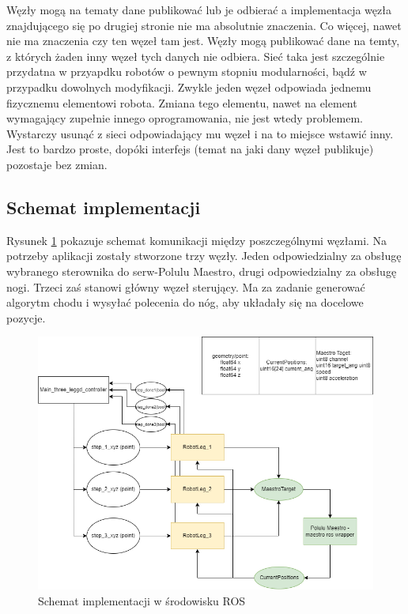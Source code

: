 Węzły mogą na tematy dane publikować lub je odbierać a implementacja węzła znajdującego się po drugiej stronie nie ma absolutnie znaczenia. Co więcej, nawet nie ma znaczenia czy ten węzeł tam jest. Węzły mogą publikować dane na temty, z których żaden inny węzeł tych danych nie odbiera. Sieć taka jest szczególnie przydatna w przyapdku robotów o pewnym stopniu modularności, bądź w przypadku dowolnych modyfikacji. Zwykle jeden węzeł odpowiada jednemu fizycznemu elementowi robota. Zmiana tego elementu, nawet na element wymagający zupełnie innego oprogramowania, nie jest wtedy problemem. Wystarczy usunąć z sieci odpowiadający mu węzeł i na to miejsce wstawić inny. Jest to bardzo proste, dopóki interfejs (temat na jaki dany węzeł publikuje) pozostaje bez zmian. \cite{ROS_docs}
\subsection{Schemat implementacji}

Rysunek \ref{ros_implementation_schematic} pokazuje schemat komunikacji między poszczególnymi węzłami. Na potrzeby aplikacji zostały stworzone trzy węzły. Jeden odpowiedzialny za obsługę wybranego sterownika do serw-Polulu Maestro, drugi odpowiedzialny za obsługę nogi. Trzeci zaś stanowi główny węzeł sterujący. Ma za zadanie generować algorytm chodu i wysyłać polecenia do nóg, aby układały się na docelowe pozycje.

\begin{figure}[h!]
\includegraphics[width=\textwidth]{img/implementation_schematic.png}
\caption{Schemat implementacji w środowisku ROS}
\label{ros_implementation_schematic}
\end{figure}


